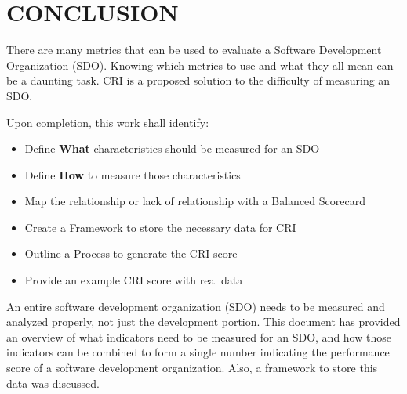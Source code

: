 \documentclass[SDSUThesis.tex]{subfiles}
\begin{document}
\section{CONCLUSION}

There are many metrics that can be used to evaluate a Software Development Organization (SDO). 
Knowing which metrics to use and what they all mean can be a daunting task.  CRI is a
proposed solution to the difficulty of measuring an SDO.

Upon completion, this work shall identify:
\begin{itemize}
    \item Define \textbf{What} characteristics should be measured for an SDO
    \item Define \textbf{How} to measure those characteristics
    \item Map the relationship or lack of relationship with a Balanced Scorecard
    \item Create a Framework to store the necessary data for CRI
    \item Outline a Process to generate the CRI score
    \item Provide an example CRI score with real data
\end{itemize}

An entire software development organization (SDO) needs to be measured and analyzed properly, not just the development portion. This document has provided an overview of what indicators need to be measured for an SDO, and how those indicators can be combined to form a single number indicating the performance score of a software development organization.  Also, a framework to store this data was discussed.
\end{document}
